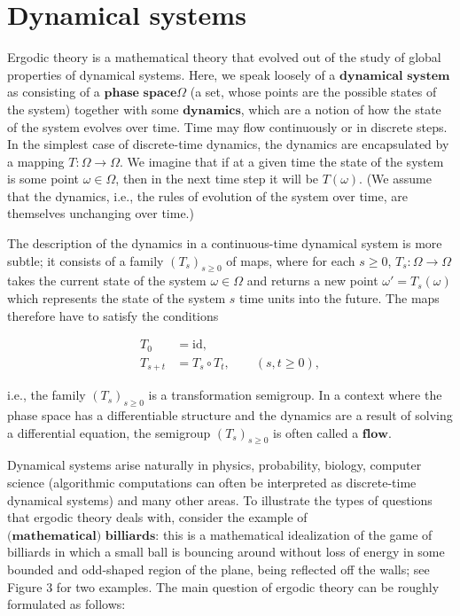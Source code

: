 \documentclass[11pt]{report}
\theoremstyle{plain}
\theoremstyle{definition}
\begin{document}
\chapter{Dynamical systems}

Ergodic theory is a mathematical theory that evolved
out of the study of global properties of dynamical
systems. Here, we speak loosely of a
$\textbf{dynamical system}$ as consisting of a
$\textbf{phase space}$$\Omega$ (a set, whose points
are the possible states of the system) together with
some $\textbf{dynamics}$, which are a notion of how
the state of the system evolves over time. Time may
flow continuously or in discrete steps. In the
simplest case of discrete-time dynamics, the dynamics
are encapsulated by a mapping $T:\Omega\to \Omega$.
We imagine that if at a given time the state of the
system is some point $\omega \in \Omega$, then in the
next time step it will be $T(\omega)$. (We assume
that the dynamics, i.e., the rules of evolution of the
system over time, are themselves unchanging over
time.)

The description of the dynamics in a continuous-time
dynamical system is more subtle; it consists of a
family $(T_s)_{s\ge 0}$ of maps, where for each
$s\ge 0$, $T_s:\Omega\to \Omega$ takes the current
state of the system $\omega\in \Omega$ and returns a
new point $\omega'=T_s(\omega)$ which represents the
state of the system $s$ time units into the future.
The maps therefore have to satisfy the conditions

\begin{align*}
T_0 &= \textrm{id}, \\
T_{s+t} &= T_s \circ T_t, \qquad (s,t\ge 0),
\end{align*}

\noindent i.e., the family $(T_s)_{s\ge 0}$ is a transformation
semigroup. In a context where the phase space has a
differentiable structure and the dynamics are a result
of solving a differential equation, the semigroup
$(T_s)_{s\ge0}$ is often called a $\textbf{flow}$.

Dynamical systems arise naturally in physics,
probability, biology, computer science (algorithmic
computations can often be interpreted as discrete-time
dynamical systems) and many other areas. To illustrate
the types of questions that ergodic theory deals with,
consider the example of
$\textbf{(mathematical) billiards}$: this is a
mathematical idealization of the game of billiards in
which a small ball is bouncing around without loss of
energy in some bounded and odd-shaped region of the
plane, being reflected off the walls; see Figure 3 for
two examples. The main question of ergodic theory can
be roughly formulated as follows:
\end{document}
